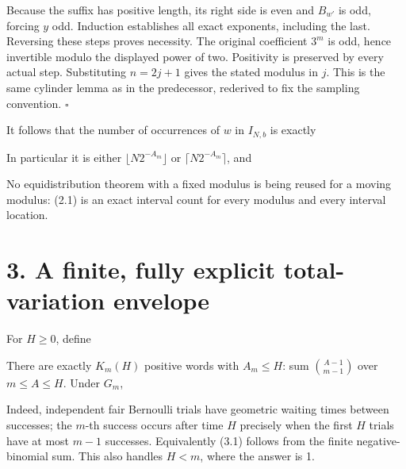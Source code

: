 
Because the suffix has positive length, its right side is even and
\(B_{w'}\) is odd, forcing \(y\) odd. Induction establishes all exact
exponents, including the last. Reversing these steps proves necessity.
The original coefficient \(3^m\) is odd, hence invertible modulo the
displayed power of two. Positivity is preserved by every actual step.
Substituting \(n=2j+1\) gives the stated modulus in \(j\). This is the
same cylinder lemma as in the predecessor, rederived to fix the sampling
convention. \(\square\)

It follows that the number of occurrences of \(w\) in \(I_{N,b}\) is
exactly


In particular it is either \(\lfloor N2^{-A_m}\rfloor\) or
\(\lceil N2^{-A_m}\rceil\), and


No equidistribution theorem with a fixed modulus is being reused for a
moving modulus: (2.1) is an exact interval count for every modulus and
every interval location.

\section{3. A finite, fully explicit total-variation envelope}

For \(H\ge0\), define


There are exactly \(K_m(H)\) positive words with \(A_m\le H\): sum
\(\binom{A-1}{m-1}\) over \(m\le A\le H\). Under \(G_m\),


Indeed, independent fair Bernoulli trials have geometric waiting times
between successes; the \(m\)-th success occurs after time \(H\)
precisely when the first \(H\) trials have at most \(m-1\) successes.
Equivalently (3.1) follows from the finite negative-binomial sum. This
also handles \(H<m\), where the answer is 1.

